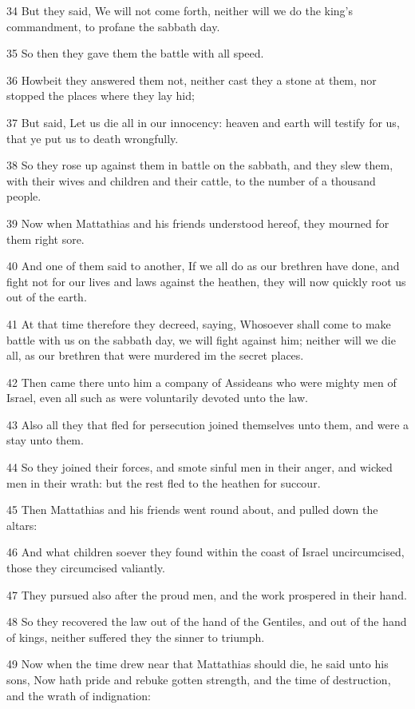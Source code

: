 \par 34 But they said, We will not come forth, neither will we do the king's commandment, to profane the sabbath day.
\par 35 So then they gave them the battle with all speed.
\par 36 Howbeit they answered them not, neither cast they a stone at them, nor stopped the places where they lay hid;
\par 37 But said, Let us die all in our innocency: heaven and earth will testify for us, that ye put us to death wrongfully.
\par 38 So they rose up against them in battle on the sabbath, and they slew them, with their wives and children and their cattle, to the number of a thousand people.
\par 39 Now when Mattathias and his friends understood hereof, they mourned for them right sore.
\par 40 And one of them said to another, If we all do as our brethren have done, and fight not for our lives and laws against the heathen, they will now quickly root us out of the earth.
\par 41 At that time therefore they decreed, saying, Whosoever shall come to make battle with us on the sabbath day, we will fight against him; neither will we die all, as our brethren that were murdered im the secret places.
\par 42 Then came there unto him a company of Assideans who were mighty men of Israel, even all such as were voluntarily devoted unto the law.
\par 43 Also all they that fled for persecution joined themselves unto them, and were a stay unto them.
\par 44 So they joined their forces, and smote sinful men in their anger, and wicked men in their wrath: but the rest fled to the heathen for succour.
\par 45 Then Mattathias and his friends went round about, and pulled down the altars:
\par 46 And what children soever they found within the coast of Israel uncircumcised, those they circumcised valiantly.
\par 47 They pursued also after the proud men, and the work prospered in their hand.
\par 48 So they recovered the law out of the hand of the Gentiles, and out of the hand of kings, neither suffered they the sinner to triumph.
\par 49 Now when the time drew near that Mattathias should die, he said unto his sons, Now hath pride and rebuke gotten strength, and the time of destruction, and the wrath of indignation:
